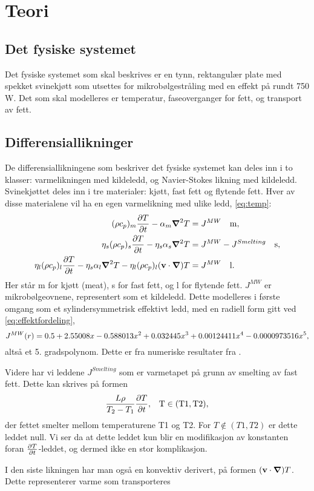 \chapter{Teori}
\section{Det fysiske systemet}
Det fysiske systemet som skal beskrives er en tynn, rektangulær plate med
spekket svinekjøtt som utsettes for mikrobølgestråling med en effekt på rundt
750 W. Det som skal modelleres er temperatur, faseoverganger for fett, og
transport av fett.

\section{Differensiallikninger}
De differensiallikningene som beskriver det fysiske systemet kan deles inn i to
klasser: varmelikningen med kildeledd, og Navier-Stokes likning med kildeledd.
Svinekjøttet deles inn i tre materialer: kjøtt, fast fett og flytende fett. Hver
av disse materialene vil ha en egen varmelikning med ulike ledd, \cref{eq:temp}:
\begin{align}
  \label{eq:temp}
  (\rho c_p)_m \frac{\partial T}{\partial t} - \alpha_m \mbox{\boldmath$ \nabla $} ^2 T &= J^{MW} \quad \rm{m,} \\
  \eta_s (\rho c_p)_s \frac{\partial T}{\partial t} - \eta_s\alpha_s \mbox{\boldmath$ \nabla $} ^2 T &= J^{MW} - J^{Smelting}  \quad \rm{s,} \\
  \eta_l (\rho c_p)_l \frac{\partial T}{\partial t} - \eta_s\alpha_l \mbox{\boldmath$ \nabla $} ^2 T - \eta_l(\rho c_p)_l(\mathbf{v}\cdot
  \mbox{\boldmath$ \nabla $})T &= J^{MW}  \quad \rm{l.}
\end{align}
Her står m for kjøtt (meat), s for fast fett, og l for flytende fett. $J^{MW}$
er mikrobølgeovnene, representert som et kildeledd. Dette modelleres i første
omgang som et sylindersymmetrisk effektivt ledd, med en radiell form gitt ved
\cref{eq:effektfordeling},
\begin{equation}
  J^{MW}(r) = 0.5 + 2.55008x - 0.588013x^2 + 0.032445x^3 + 0.00124411x^4 - 0.0000973516x^5 \rm{,}
  \label{eq:effektfordeling}
\end{equation}
altså et 5. gradspolynom. Dette er fra numeriske resultater fra \cite{huang+zhu}.

Videre har vi leddene $J^{Smelting}$ som er varmetapet på grunn av smelting av
fast fett. Dette kan skrives på formen \[ \frac{L \rho}{T_2-T_1} \frac{\partial T}{\partial t}
\rm{,} \quad T \in (T1,T2) \rm{,}\] der fettet smelter mellom temperaturene T1
og T2. For $T \notin (T1,T2)$ er dette leddet null. Vi ser da at dette leddet kun
blir en modifikasjon av konstanten foran $\frac{\partial T}{\partial t}$-leddet, og dermed ikke en
stor komplikasjon.

I den siste likningen har man også en konvektiv derivert, på formen $(\mathbf{v}\cdot
\mbox{\boldmath$ \nabla $})T$. Dette representerer varme som transporteres 

